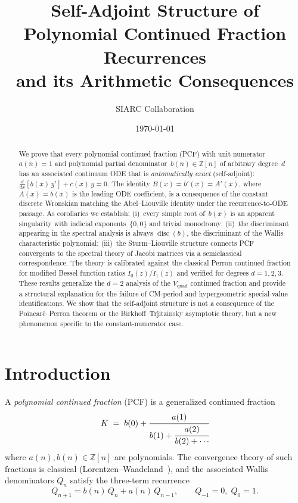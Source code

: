 \documentclass[11pt,a4paper]{amsart}
\title[Self-Adjoint Structure of PCF Recurrences]{%
  Self-Adjoint Structure of Polynomial Continued Fraction Recurrences\\
  and its Arithmetic Consequences}
\author{SIARC Collaboration}
\date{\today}
\theoremstyle{plain}
\theoremstyle{definition}
\theoremstyle{remark}
\newcommand{\Z}{\mathbb{Z}}
\newcommand{\disc}{\operatorname{disc}}
\newcommand{\Vquad}{V_{\mathrm{quad}}}
\begin{document}
\begin{abstract}
We prove that every polynomial continued fraction (PCF) with unit
numerator~$a(n)=1$ and polynomial partial denominator~$b(n)\in\Z[n]$
of arbitrary degree~$d$ has an associated continuum ODE that is
\emph{automatically exact} (self-adjoint):
$\frac{d}{dx}[b(x)\,y'] + c(x)\,y = 0$.
The identity $B(x) = b'(x) = A'(x)$, where $A(x)=b(x)$ is the
leading ODE coefficient, is a consequence of the constant discrete
Wronskian matching the Abel--Liouville identity under the
recurrence-to-ODE passage.  As corollaries we establish:
(i)~every simple root of~$b(x)$ is an apparent singularity with
indicial exponents~$\{0,0\}$ and trivial monodromy;
(ii)~the discriminant appearing in the spectral analysis is always
$\disc(b)$, the discriminant of the Wallis characteristic polynomial;
(iii)~the Sturm--Liouville structure connects PCF convergents to
the spectral theory of Jacobi matrices via a semiclassical
correspondence.  The theory is calibrated against the classical
Perron continued fraction for modified Bessel function ratios
$I_0(z)/I_1(z)$ and verified for degrees $d=1,2,3$.
These results generalize the $d=2$ analysis of the
$\Vquad$ continued fraction and provide a structural explanation
for the failure of CM-period and hypergeometric special-value
identifications.  We show that the self-adjoint structure is not a
consequence of the Poincar\'e--Perron theorem or the
Birkhoff--Trjitzinsky asymptotic theory, but a new phenomenon
specific to the constant-numerator case.
\end{abstract}

\maketitle
\tableofcontents

\section{Introduction}\label{sec:intro}

A \emph{polynomial continued fraction} (PCF) is a generalized
continued fraction
\begin{equation}\label{eq:pcf-def}
  K \;=\; b(0) + \cfrac{a(1)}{b(1) + \cfrac{a(2)}{b(2) + \cdots}}
\end{equation}
where $a(n),b(n)\in\Z[n]$ are polynomials.  The convergence theory
of such fractions is classical (Lorentzen--Waadeland~\cite{LW92}),
and the associated Wallis denominators $Q_n$ satisfy the three-term
recurrence
\begin{equation}\label{eq:wallis}
  Q_{n+1} = b(n)\,Q_n + a(n)\,Q_{n-1}, \qquad
  Q_{-1}=0,\; Q_0=1.
\end{equation}
\end{document}
